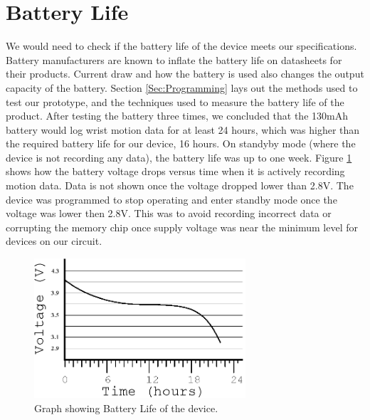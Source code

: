 \section{Battery Life}
\label{Sec:ResultsBatteryLife}
We would need to check if the battery life of the device meets our specifications.
Battery manufacturers are known to inflate the battery life on datasheets for their products.
Current draw and how the battery is used also changes the output capacity of the battery.
Section \ref{Sec:Programming} lays out the methods used to test our prototype,
and the techniques used to measure the battery life of the product.
After testing the battery three times,
we concluded that the 130mAh battery would log wrist motion data for at least 24 hours,
which was higher than the required battery life for our device,
16 hours.
On standyby mode (where the device is not recording any data), the battery life was up to one week.
Figure \ref{Fig:BatteryGraph} shows how the battery voltage drops versus time when it is actively recording motion data.
Data is not shown once the voltage dropped lower than 2.8V. The device was programmed to stop operating and enter standby mode once the voltage was lower then 2.8V. This was to avoid recording incorrect data or corrupting the memory chip once supply voltage was near the minimum level for devices on our circuit.

\begin{figure}
\begin{center}
\includegraphics[width=0.7\textwidth]{images/BattLife.eps}
\caption{Graph showing Battery Life of the device.}
\label{Fig:BatteryGraph}
\end{center}
\end{figure}


